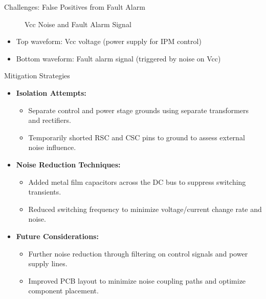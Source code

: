 \begin{frame}{Challenges: False Positives from Fault Alarm}

	\begin{figure}
		\centering
		\caption{Vcc Noise and Fault Alarm Signal}
	\end{figure}

	\begin{itemize}
		\item Top waveform: Vcc voltage (power supply for IPM control)
		\item Bottom waveform: Fault alarm signal (triggered by noise on Vcc)
	\end{itemize}

\end{frame}
\begin{frame}{Mitigation Strategies}

	\begin{itemize}
		\item \textbf{Isolation Attempts:}
			\begin{itemize}
				\item Separate control and power stage grounds using separate transformers and rectifiers.
				\item Temporarily shorted RSC and CSC pins to ground to assess external noise influence.
			\end{itemize}
		\item \textbf{Noise Reduction Techniques:}
			\begin{itemize}
				\item Added metal film capacitors across the DC bus to suppress switching transients.
				\item Reduced switching frequency to minimize voltage/current change rate and noise.
			\end{itemize}
		\item \textbf{Future Considerations:}
			\begin{itemize}
				\item Further noise reduction through filtering on control signals and power supply lines.
				\item Improved PCB layout to minimize noise coupling paths and optimize component placement.
			\end{itemize}
	\end{itemize}
	
	\end{frame}

